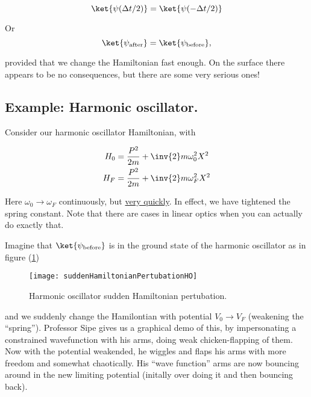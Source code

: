 \begin{equation}\label{eqn:qmTwoL8:180}
\ket{\psi(\Delta t/2)} = \ket{\psi(-\Delta t/2)}
\end{equation}

Or
\begin{equation}\label{eqn:qmTwoL8:200}
\ket{\psi_{\text{after}}} = \ket{\psi_{\text{before}}},
\end{equation}

provided that we change the Hamiltonian fast enough.  On the surface there appears to be no consequences, but there are some very serious ones!

\subsection{Example: Harmonic oscillator.}

Consider our harmonic oscillator Hamiltonian, with

\begin{align}\label{eqn:qmTwoL8:220}
H_0 &= \frac{P^2}{2m} + \inv{2} m \omega_0^2 X^2 \\
H_F &= \frac{P^2}{2m} + \inv{2} m \omega_F^2 X^2
\end{align}

Here $\omega_0 \rightarrow \omega_F$ continuously, but \underline{very quickly}.  In effect, we have tightened the spring constant.  Note that there are cases in linear optics when you can actually do exactly that.

Imagine that $\ket{\psi_{\text{before}}}$ is in the ground state of the harmonic oscillator as in figure (\ref{fig:suddenHamiltonianPertubationHO})

\begin{figure}[htp]
\centering
\texttt{[image: suddenHamiltonianPertubationHO]}
\caption{Harmonic oscillator sudden Hamiltonian pertubation.}\label{fig:suddenHamiltonianPertubationHO}
\end{figure}

and we suddenly change the Hamilontian with potential $V_0 \rightarrow V_F$ (weakening the ``spring'').  Professor Sipe gives us a graphical demo of this, by impersonating a constrained wavefunction with his arms, doing weak chicken-flapping of them.  Now with the potential weakended, he wiggles and flaps his arms with more freedom and somewhat chaotically.  His ``wave function'' arms are now bouncing around in the new limiting potential (initally over doing it and then bouncing back).

